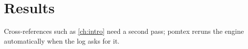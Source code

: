 \chapter{Results}\label{ch:results}
Cross-references such as \cref{ch:intro} need a second pass; pomtex reruns
the engine automatically when the log asks for it.
